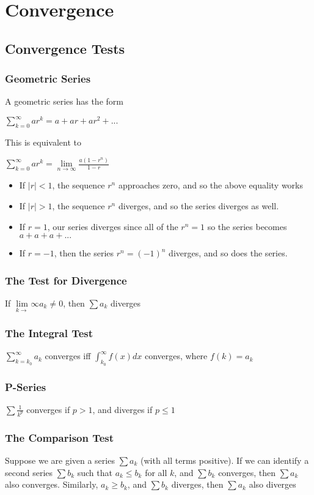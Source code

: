 \documentclass[12pt]{report}
\begin{document}
\chapter{Convergence}
	\section{Convergence Tests}
		\subsection{Geometric Series}
			A geometric series has the form\\
			\centerline{$\sum_{k=0}^{\infty} ar^k = a + ar + ar^2 + ...$}
			This is equivalent to\\
			\centerline{$\sum_{k=0}^{\infty} ar^k = \lim\limits_{n\rightarrow \infty} \frac{a(1-r^n)}{1-r}$}
			\begin{itemize}
				\item If $|r| < 1$, the sequence $r^n$ approaches zero, and so the above equality works\\
				\item If $|r| > 1$, the sequence $r^n$ diverges, and so the series diverges as well.
				\item If $r = 1$, our series diverges since all of the $r^n = 1$ so the series becomes $a + a + a + ...$
				\item If $r = -1$, then the series $r^n = (-1)^n$ diverges, and so does the series.
			\end{itemize}
		\subsection{The Test for Divergence}
			If $\lim\limits_{k\rightarrow} \infty a_k \neq 0$, then $\sum a_k$ diverges
		\subsection{The Integral Test}
			$\sum_{k = k_0}^{\infty} a_k$ converges iff $\int_{k_0}^{\infty} f(x)dx$ converges, where $f(k) = a_k$
		\subsection{P-Series}
			$\sum \frac{1}{k^p}$ converges if $p > 1$, and diverges if $p \leq 1$
		\subsection{The Comparison Test}
			Suppose we are given a series $\sum a_k$ (with all terms positive). If we can identify a second series $\sum b_k$ such that $a_k \leq b_k$ for all $k$, and $\sum b_k$ converges, then $\sum a_k$ also converges. Similarly, $a_k \geq b_k$, and $\sum b_k$ diverges, then $\sum a_k$ also diverges
\end{document}
